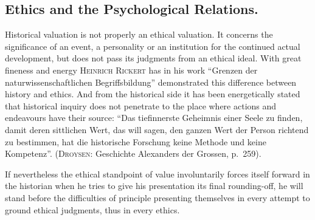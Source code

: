 \documentclass[12pt]{article}
\newcommand{\opage}[1]{\marginnote{\footnotesize\textit{[#1]}}}
\begin{document}
\subsection{Ethics and the Psychological Relations.}
\label{sec:4b}

\noindent Historical valuation is not properly an ethical valuation. It
concerns the significance of an event, a personality or an institution for
the continued actual development, but does not pass its judgments from an
ethical ideal. With great fineness and energy \textsc{Heinrich Rickert} has
in his work ``Grenzen der naturwissenschaftlichen Begriffsbildung''
demonstrated this difference between history and ethics. And from the
historical side it has been energetically stated that historical inquiry
does not penetrate to the place where actions and endeavours have their
source: ``Das tiefinnerste Geheimnis einer Seele zu finden, damit deren
sittlichen Wert, das will sagen, den ganzen Wert der Person richtend zu
bestimmen, hat die historische Forschung keine Methode und keine
Kompetenz''. (\textsc{Droysen}: Geschichte Alexanders der Grossen, p.~259).

If nevertheless the ethical standpoint of value involuntarily forces itself
forward in the historian when he tries to give his presentation its final
rounding-off, he will stand before \opage{82}the difficulties of principle presenting
themselves in every attempt to ground ethical judgments, thus in every
ethics.
\end{document}
